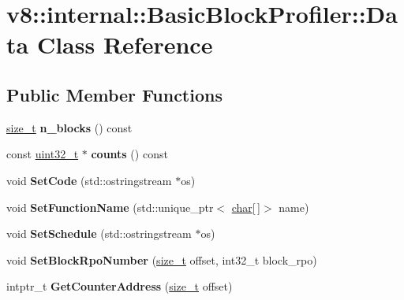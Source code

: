 \hypertarget{classv8_1_1internal_1_1BasicBlockProfiler_1_1Data}{}\section{v8\+:\+:internal\+:\+:Basic\+Block\+Profiler\+:\+:Data Class Reference}
\label{classv8_1_1internal_1_1BasicBlockProfiler_1_1Data}
\subsection*{Public Member Functions}
\begin{DoxyCompactItemize}
\item 
\mbox{\label{classv8_1_1internal_1_1BasicBlockProfiler_1_1Data_a8689e57b16ec37b029b5bff851ce42a4}} 
\mbox{\hyperlink{classsize__t}{size\+\_\+t}} {\bfseries n\+\_\+blocks} () const
\item 
\mbox{\label{classv8_1_1internal_1_1BasicBlockProfiler_1_1Data_a0f3147946321feba921b010388c40512}} 
const \mbox{\hyperlink{classuint32__t}{uint32\+\_\+t}} $\ast$ {\bfseries counts} () const
\item 
\mbox{\label{classv8_1_1internal_1_1BasicBlockProfiler_1_1Data_a4eb5bc5ffe21e67d2ee24e6111ba0950}} 
void {\bfseries Set\+Code} (std\+::ostringstream $\ast$os)
\item 
\mbox{\label{classv8_1_1internal_1_1BasicBlockProfiler_1_1Data_a4fa22b5ad015e1ee0ebc66f3c3f267bf}} 
void {\bfseries Set\+Function\+Name} (std\+::unique\+\_\+ptr$<$ \mbox{\hyperlink{classchar}{char}}\mbox{[}$\,$\mbox{]}$>$ name)
\item 
\mbox{\label{classv8_1_1internal_1_1BasicBlockProfiler_1_1Data_a825e148b427e8231ddd9f995e371a73e}} 
void {\bfseries Set\+Schedule} (std\+::ostringstream $\ast$os)
\item 
\mbox{\label{classv8_1_1internal_1_1BasicBlockProfiler_1_1Data_a437cdb58aeb42ea63ad3c4b101c1a161}} 
void {\bfseries Set\+Block\+Rpo\+Number} (\mbox{\hyperlink{classsize__t}{size\+\_\+t}} offset, int32\+\_\+t block\+\_\+rpo)
\item 
\mbox{\label{classv8_1_1internal_1_1BasicBlockProfiler_1_1Data_ac88de34d27672aa25aed507cdd2e0b84}} 
intptr\+\_\+t {\bfseries Get\+Counter\+Address} (\mbox{\hyperlink{classsize__t}{size\+\_\+t}} offset)
\end{DoxyCompactItemize}
